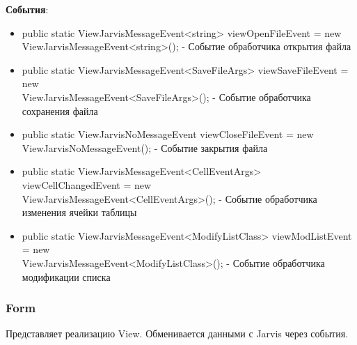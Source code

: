 \documentclass[a4paper,12pt, fleqn]{article}
\theoremstyle{plain} %
\theoremstyle{definition} %
\theoremstyle{remark} %
\numberwithin{equation}{section}
\begin{document}
\textbf{События}:
\begin{itemize}
	\item public static ViewJarvisMessageEvent<string> viewOpenFileEvent = new\\ ViewJarvisMessageEvent<string>(); - Событие обработчика открытия файла
	\item public static ViewJarvisMessageEvent<SaveFileArgs> viewSaveFileEvent = new\\ ViewJarvisMessageEvent<SaveFileArgs>(); - Событие обработчика сохранения файла
	\item public static ViewJarvisNoMessageEvent viewCloseFileEvent = new\\ ViewJarvisNoMessageEvent(); - Событие закрытия файла
	\item public static ViewJarvisMessageEvent<CellEventArgs> viewCellChangedEvent = new\\ ViewJarvisMessageEvent<CellEventArgs>(); - Событие обработчика изменения ячейки таблицы
	\item public static ViewJarvisMessageEvent<ModifyListClass> viewModListEvent = new\\ ViewJarvisMessageEvent<ModifyListClass>(); - Событие обработчика модификации списка
\end{itemize}
\subsubsection{Form}
Представляет реализацию View\cite{Tit}\cite{DataGridView}. Обменивается данными с Jarvis через события. 
\end{document}
